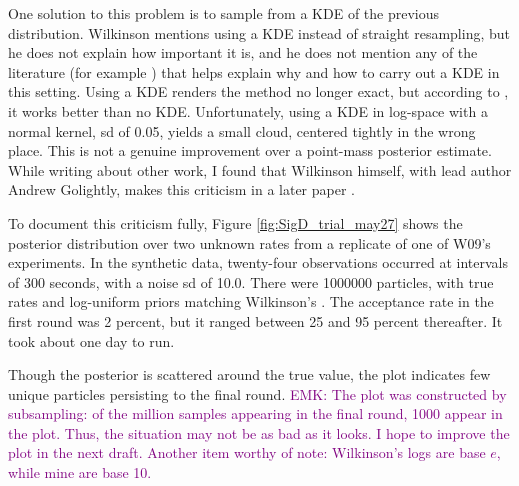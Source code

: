 \documentclass{article}
\newcommand\EMK[1]{\textcolor{purple}{EMK: #1}}
\begin{document}
One solution to this problem is to sample from a KDE of the previous distribution. Wilkinson mentions using a KDE instead of straight resampling, but he does not explain how important it is, and he does not mention any of the literature (for example \cite{particle_filter_tutorial}) that helps explain why and how to carry out a KDE in this setting.  Using a KDE renders the method no longer exact, but according to \cite{particle_filter_tutorial}, it works better than no KDE. %
Unfortunately, using a KDE in log-space with a normal kernel, sd of 0.05, yields a small cloud, centered tightly in the wrong place. This is not a genuine improvement over a point-mass posterior estimate. While writing about other work, I found that Wilkinson himself, with lead author Andrew Golightly, makes this criticism in a later paper \cite{golightly2011bayesian}. 

To document this criticism fully, Figure \ref{fig:SigD_trial_may27} shows the posterior distribution over two unknown rates from a replicate of one of W09's experiments. In the synthetic data, twenty-four observations occurred at intervals of 300 seconds, with a noise sd of 10.0. There were 1000000 particles, with true rates and log-uniform priors matching Wilkinson's
. The acceptance rate in the first round was 2 percent, but it ranged between 25 and 95 percent thereafter. It took about one day to run. 

Though the posterior is scattered around the true value, the plot indicates few unique particles persisting to the final round. \EMK{The plot was constructed by subsampling: of the million samples appearing in the final round, 1000 appear in the plot. Thus, the situation may not be as bad as it looks. I hope to improve the plot in the next draft. Another item worthy of note: Wilkinson's logs are base $e$, while mine are base 10.}
\end{document}
